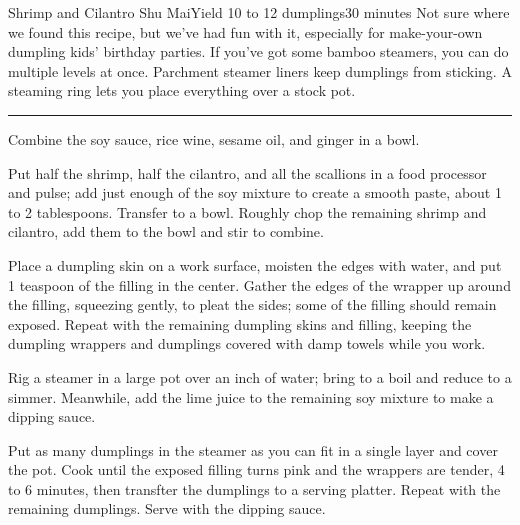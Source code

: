 \begin{recipe}{Shrimp and Cilantro Shu Mai}{Yield 10 to 12 dumplings}{30 minutes}
\freeform Not sure where we found this recipe, but we've had fun with it, especially for make-your-own dumpling kids' birthday parties. If you've got some bamboo steamers, you can do multiple levels at once. Parchment steamer liners keep dumplings from sticking. A steaming ring lets you place everything over a stock pot.\\
\rule{\textwidth}{0.05pt}

Combine the soy sauce, rice wine, sesame oil, and ginger in a bowl.

Put half the shrimp, half the cilantro, and all the scallions in a food processor and pulse; add just enough of the soy mixture to create a smooth paste, about 1 to 2 tablespoons. Transfer to a bowl. Roughly chop the remaining shrimp and cilantro, add them to the bowl and stir to combine.

Place a dumpling skin on a work surface, moisten the edges with water, and put 1 teaspoon of the filling in the center. Gather the edges of the wrapper up around the filling, squeezing gently, to pleat the sides; some of the filling should remain exposed. Repeat with the remaining dumpling skins and filling, keeping the dumpling wrappers and dumplings covered with damp towels while you work.

Rig a steamer in a large pot over an inch of water; bring to a boil and reduce to a simmer. Meanwhile, add the lime juice to the remaining soy mixture to make a dipping sauce.

\newstep
Put as many dumplings in the steamer as you can fit in a single layer and cover the pot. Cook until the exposed filling turns pink and the wrappers are tender, 4 to 6 minutes, then transfter the dumplings to a serving platter. Repeat with the remaining dumplings. Serve with the dipping sauce.

\end{recipe}